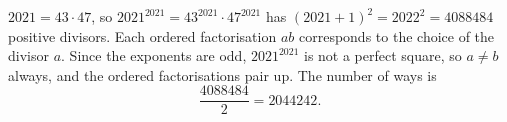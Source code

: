 $2021=43\cdot47$, so $2021^{2021}=43^{2021}\cdot47^{2021}$ has $(2021+1)^2=2022^2=4088484$ positive divisors. Each ordered factorisation $ab$ corresponds to the choice of the divisor $a$. Since the exponents are odd, $2021^{2021}$ is not a perfect square, so $a\ne b$ always, and the ordered factorisations pair up. The number of ways is
\[\dfrac{4088484}{2}=\boxed{2044242}.\]
